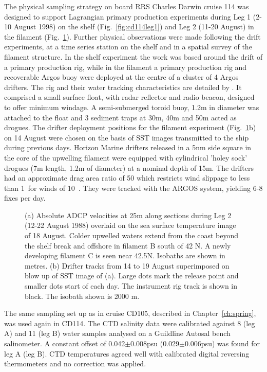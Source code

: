 The physical sampling strategy on board RRS Charles Darwin cruise
114 was designed to support Lagrangian primary production
experiments during Leg 1 (2-10 August 1998) on the shelf
(Fig.~\ref{fig:cd114leg1}) and Leg 2 (11-20 August) in the
filament (Fig.~\ref{fig:cd114leg2}). Further physical observations
were made following the drift experiments, at a time series
station on the shelf and in a spatial survey of the filament
structure. In the shelf experiment the work was based around the
drift of a primary production rig, while in the filament a primary
production rig and recoverable Argos buoy were deployed at the
centre of a cluster of 4 Argos drifters.   The rig and their water
tracking characteristics are detailed by \citet{Joint01}. It
comprised a small surface float, with radar reflector and radio
beacon, designed to offer minimum windage. A semi-submerged toroid
buoy, 1.2m in diameter was attached to the float and 3 sediment
traps at 30m, 40m and 50m acted as drogues. The drifter deployment
positions for the filament experiment (Fig.~\ref{fig:cd114leg2}b)
on 14 August were chosen on the basis of SST images transmitted to
the ship during previous days. Horizon Marine drifters released in
a 5nm side square in the core of the upwelling filament were
equipped with cylindrical 'holey sock' drogues (7m length, 1.2m of
diameter) at a nominal depth of 15m. The drifters had an
approximate drag area ratio of 50 which restricts wind slippage to
less than 1\velc\, for winds of 10\vel\, \citep{Niiler95}. They
were tracked with the ARGOS system, yielding 6-8 fixes per day.
\begin{figure} \centering %
\arribacap
{}%
%
\caption{(a) Absolute ADCP velocities at 25m along sections during
Leg 2 (12-22 August 1988) overlaid on the sea surface temperature
image of 18 August. Colder upwelled waters extend from the coast
beyond the shelf break and offshore in filament B south of 42\deg
N. A newly developing filament C is seen near 42.5\deg N. Isobaths
are shown in metres. (b) Drifter tracks from 14 to 19 August
superimposed on blow up of SST image of (a). Large dots mark the
release point and smaller dots start of each
day. The instrument rig track is shown in black. The isobath shown is 2000 m.}%
\label{fig:cd114leg2}%
\end{figure}
The same sampling set up as in cruise CD105, described in
Chapter~\ref{ch:spring}, was used again in CD114. The CTD salinity
data were calibrated against 8 (leg A) and 11 (leg B) water
samples analysed on a Guildline Autosal bench salinometer. A
constant offset of 0.042$\pm$0.008psu (0.029$\pm$0.006psu)  was
found for leg A (leg B). CTD temperatures agreed well with
calibrated digital reversing thermometers and no correction was
applied.

